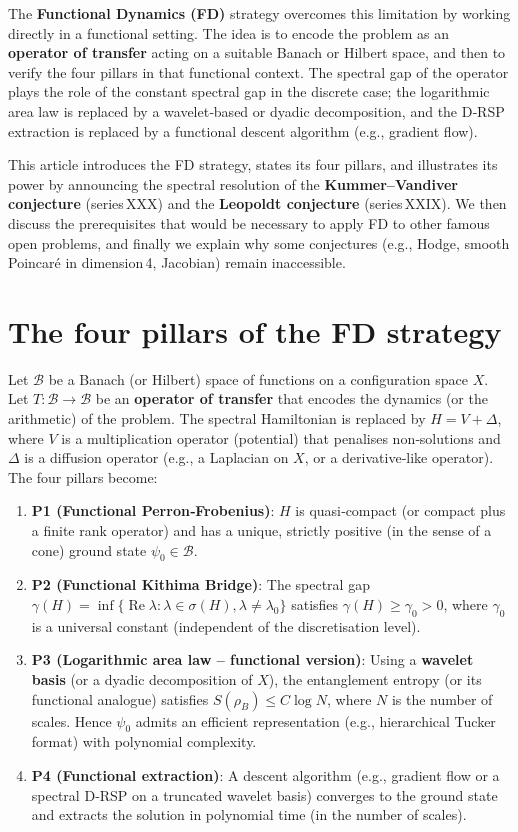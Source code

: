 \documentclass[11pt,a4paper]{article}
\begin{document}
The \textbf{Functional Dynamics (FD)} strategy overcomes this limitation by working directly in a functional setting. The idea is to encode the problem as an \textbf{operator of transfer} acting on a suitable Banach or Hilbert space, and then to verify the four pillars in that functional context. The spectral gap of the operator plays the role of the constant spectral gap in the discrete case; the logarithmic area law is replaced by a wavelet‑based or dyadic decomposition, and the D‑RSP extraction is replaced by a functional descent algorithm (e.g., gradient flow).

This article introduces the FD strategy, states its four pillars, and illustrates its power by announcing the spectral resolution of the \textbf{Kummer–Vandiver conjecture} (series XXX) and the \textbf{Leopoldt conjecture} (series XXIX). We then discuss the prerequisites that would be necessary to apply FD to other famous open problems, and finally we explain why some conjectures (e.g., Hodge, smooth Poincaré in dimension 4, Jacobian) remain inaccessible.

\section{The four pillars of the FD strategy}

Let $\mathcal{B}$ be a Banach (or Hilbert) space of functions on a configuration space $X$. Let $T: \mathcal{B} \to \mathcal{B}$ be an \textbf{operator of transfer} that encodes the dynamics (or the arithmetic) of the problem. The spectral Hamiltonian is replaced by $H = V + \Delta$, where $V$ is a multiplication operator (potential) that penalises non‑solutions and $\Delta$ is a diffusion operator (e.g., a Laplacian on $X$, or a derivative‑like operator). The four pillars become:

\begin{enumerate}
\item \textbf{P1 (Functional Perron‑Frobenius)}: $H$ is quasi‑compact (or compact plus a finite rank operator) and has a unique, strictly positive (in the sense of a cone) ground state $\psi_0 \in \mathcal{B}$.
\item \textbf{P2 (Functional Kithima Bridge)}: The spectral gap $\gamma(H) = \inf\{ \operatorname{Re}\lambda : \lambda \in \sigma(H), \lambda \neq \lambda_0 \}$ satisfies $\gamma(H) \ge \gamma_0 > 0$, where $\gamma_0$ is a universal constant (independent of the discretisation level).
\item \textbf{P3 (Logarithmic area law – functional version)}: Using a \textbf{wavelet basis} (or a dyadic decomposition of $X$), the entanglement entropy (or its functional analogue) satisfies $S(\rho_B) \le C \log N$, where $N$ is the number of scales. Hence $\psi_0$ admits an efficient representation (e.g., hierarchical Tucker format) with polynomial complexity.
\item \textbf{P4 (Functional extraction)}: A descent algorithm (e.g., gradient flow or a spectral D‑RSP on a truncated wavelet basis) converges to the ground state and extracts the solution in polynomial time (in the number of scales).
\end{enumerate}
\end{document}
